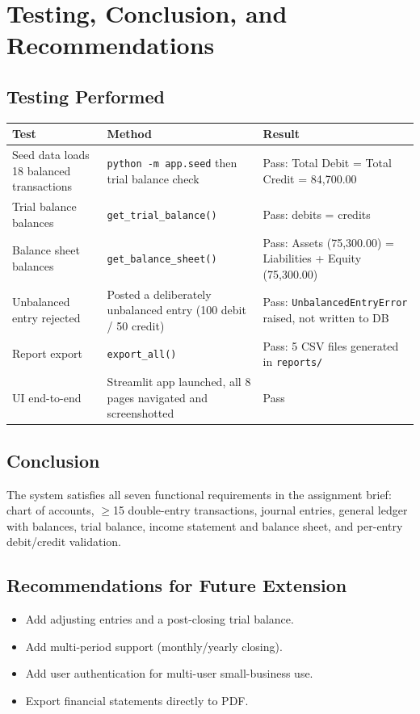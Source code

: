 \documentclass[11pt]{article}
\begin{document}
\section{Testing, Conclusion, and Recommendations}

\subsection*{Testing Performed}

\begin{longtable}{p{3.5cm} p{4.5cm} p{5.5cm}}
\toprule
\textbf{Test} & \textbf{Method} & \textbf{Result} \\
\midrule
\endhead
Seed data loads 18 balanced transactions & \texttt{python -m app.seed} then trial balance check & Pass: Total Debit = Total Credit = 84{,}700.00 \\
Trial balance balances & \texttt{get\_trial\_balance()} & Pass: debits = credits \\
Balance sheet balances & \texttt{get\_balance\_sheet()} & Pass: Assets (75{,}300.00) = Liabilities + Equity (75{,}300.00) \\
Unbalanced entry rejected & Posted a deliberately unbalanced entry (100 debit / 50 credit) & Pass: \texttt{UnbalancedEntryError} raised, not written to DB \\
Report export & \texttt{export\_all()} & Pass: 5 CSV files generated in \texttt{reports/} \\
UI end-to-end & Streamlit app launched, all 8 pages navigated and screenshotted & Pass \\
\bottomrule
\end{longtable}

\subsection*{Conclusion}
The system satisfies all seven functional requirements in the
assignment brief: chart of accounts, $\geq$15 double-entry
transactions, journal entries, general ledger with balances, trial
balance, income statement and balance sheet, and per-entry
debit/credit validation.

\subsection*{Recommendations for Future Extension}
\begin{itemize}
    \item Add adjusting entries and a post-closing trial balance.
    \item Add multi-period support (monthly/yearly closing).
    \item Add user authentication for multi-user small-business use.
    \item Export financial statements directly to PDF.
\end{itemize}
\end{document}
